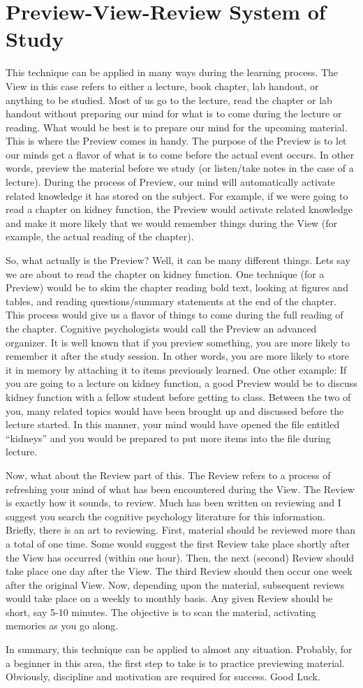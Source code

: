 \chapter[Preview-View-Review]{Preview-View-Review System of Study}

This technique can be applied in many ways during the learning process. The View in this case refers to either a lecture, book chapter, lab handout, or anything to be studied. Most of us go to the lecture, read the chapter or lab handout without preparing our mind for what is to come during the lecture or reading. What would be best is to prepare our mind for the upcoming material. This is where the Preview comes in handy. The purpose of the Preview is to let our minds get a flavor of what is to come before the actual event occurs. In other words, preview the material before we study (or listen/take notes in the case of a lecture). During the process of Preview, our mind will automatically activate related knowledge it has stored on the subject. For example, if we were going to read a chapter on kidney function, the Preview would activate related knowledge and make it more likely that we would remember things during the View (for example, the actual reading of the chapter).

So, what actually is the Preview? Well, it can be many different things. Lets say we are about to read the chapter on kidney function. One technique (for a Preview) would be to skim the chapter reading bold text, looking at figures and tables, and reading questions/summary statements at the end of the chapter. This process would give us a flavor of things to come during the full reading of the chapter. Cognitive psychologists would call the Preview an advanced organizer. It is well known that if you preview something, you are more likely to remember it after the study session. In other words, you are more likely to store it in memory by attaching it to items previously learned. One other example: If you are going to a lecture on kidney function, a good Preview would be to discuss kidney function with a fellow student before getting to class. Between the two of you, many related topics would have been brought up and discussed before the lecture started. In this manner, your mind would have opened the file entitled ``kidneys'' and you would be prepared to put more items into the file during lecture.

Now, what about the Review part of this. The Review refers to a process of refreshing your mind of what has been encountered during the View. The Review is exactly how it sounds, to review. Much has been written on reviewing and I suggest you search the cognitive psychology literature for this information. Briefly, there is an art to reviewing. First, material should be reviewed more than a total of one time. Some would suggest the first Review  take place shortly after the View has occurred (within one hour). Then, the next (second) Review should take place one day after the View. The third Review should then occur one week after the original View. Now, depending upon the material, subsequent reviews would take place on a weekly to monthly basis. Any given Review should be short, say 5-10 minutes. The objective is to scan the material, activating memories as you go along.

In summary, this technique can be applied to almost any situation. Probably, for a beginner in this area, the first step to take is to practice previewing material. Obviously, discipline and motivation are required for success. Good Luck.